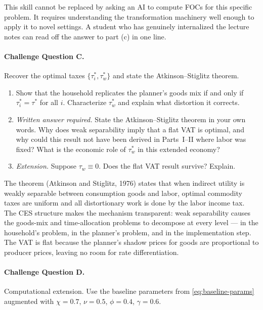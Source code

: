 \begin{calloutnote}
This skill cannot be replaced by asking an AI to compute FOCs for this specific problem. It requires understanding the transformation machinery well enough to apply it to novel settings. A student who has genuinely internalized the lecture notes can read off the answer to part (c) in one line.
\end{calloutnote}
 
\paragraph{Challenge Question C.}
Recover the optimal taxes $\{\tau_i^*, \tau_w^*\}$ and state the Atkinson--Stiglitz theorem.
 
\begin{enumerate}[label=(\alph*)]
    \item Show that the household replicates the planner's goods mix if and only if $\tau_i^* = \tau^*$ for all $i$. Characterize $\tau_w^*$ and explain what distortion it corrects.
 
    \item \emph{Written answer required.} State the Atkinson--Stiglitz theorem in your own words. Why does weak separability imply that a flat VAT is optimal, and why could this result not have been derived in Parts~I--II where labor was fixed? What is the economic role of $\tau_w^*$ in this extended economy?
 
    \item \emph{Extension.} Suppose $\tau_w \equiv 0$. Does the flat VAT result survive? Explain.
\end{enumerate}
 
\begin{calloutimportant}
The theorem (Atkinson and Stiglitz, 1976) states that when indirect utility is weakly separable between consumption goods and labor, optimal commodity taxes are uniform and all distortionary work is done by the labor income tax. The CES structure makes the mechanism transparent: weak separability causes the goods-mix and time-allocation problems to decompose at every level --- in the household's problem, in the planner's problem, and in the implementation step. The VAT is flat because the planner's shadow prices for goods are proportional to producer prices, leaving no room for rate differentiation.
\end{calloutimportant}
 
\paragraph{Challenge Question D.}
Computational extension. Use the baseline parameters from \eqref{eq:baseline-params} augmented with $\chi = 0.7$, $\nu = 0.5$, $\phi = 0.4$, $\gamma = 0.6$.
 
